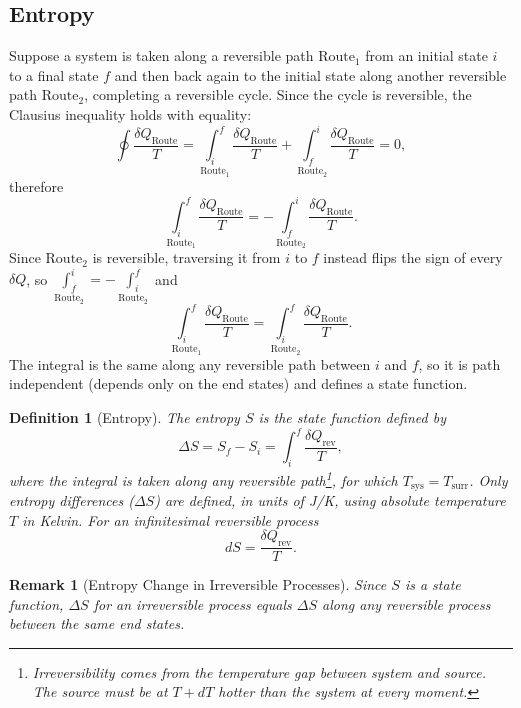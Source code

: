 \documentclass{article}
\newtheorem{definition}{Definition}
\newtheorem{remark}{Remark}
\begin{document}
\subsection{Entropy}
Suppose a system is taken along a reversible path $\text{Route}_1$ from an initial state $i$ to a final state $f$ and then back again to the initial state along another reversible path $\text{Route}_2$, completing a reversible cycle. Since the cycle is reversible, the Clausius inequality holds with equality:
\[\oint\frac{\delta Q_{\text{Route}}}{T} = \underset{\text{Route}_{1}}{\int_i^f}\frac{\delta Q_{\text{Route}}}{T} + \underset{\text{Route}_{2}}{\int_f^i}\frac{\delta Q_{\text{Route}}}{T} = 0,\]
therefore
\[\underset{\text{Route}_{1}}{\int_i^f}\frac{\delta Q_{\text{Route}}}{T} = -\underset{\text{Route}_{2}}{\int_f^i}\frac{\delta Q_{\text{Route}}}{T}.\]
Since $\text{Route}_2$ is reversible, traversing it from $i$ to $f$ instead flips the sign of every $\delta Q$, so $\underset{\text{Route}_{2}}{\int_f^i} = -\underset{\text{Route}_{2}}{\int_i^f}$ and
\[\underset{\text{Route}_{1}}{\int_i^f}\frac{\delta Q_{\text{Route}}}{T} = \underset{\text{Route}_{2}}{\int_i^f}\frac{\delta Q_{\text{Route}}}{T}.\]
The integral is the same along any reversible path between $i$ and $f$, so it is path independent (depends only on the end states) and defines a state function.
\begin{definition}[Entropy]
    The entropy $S$ is the state function defined by
    \begin{equation}
        \label{eq:entropy-change}
        \Delta S = S_f - S_i = \int_i^f \frac{\delta Q_{\text{rev}}}{T},
    \end{equation}
    where the integral is taken along any reversible path\footnote{Irreversibility comes from the temperature gap between system and source. The source must be at $T + dT$ hotter than the system at every moment.}, for which $T_{\text{sys}} = T_{\text{surr}}$. Only entropy differences ($\Delta S$) are defined, in units of J/K, using absolute temperature $T$ in Kelvin. For an infinitesimal reversible process
    \begin{equation}
        \label{eq:entropy-differential}
        dS = \frac{\delta Q_{\text{rev}}}{T}.
    \end{equation}
\end{definition}
\begin{remark}[Entropy Change in Irreversible Processes]
    Since $S$ is a state function, $\Delta S$ for an irreversible process equals $\Delta S$ along any reversible process between the same end states.
\end{remark}
\end{document}

